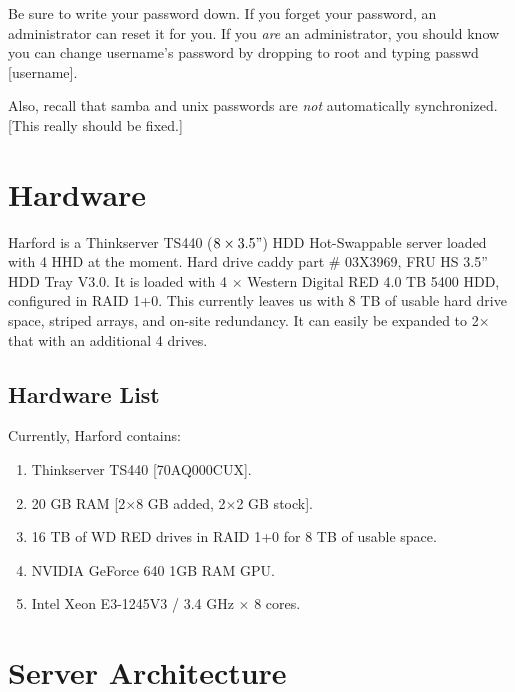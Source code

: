 \documentclass[final,titlepage,letterpaper,oneside,12pt]{article}
\renewcommand{\texttt}[2][BrickRed]{\textcolor{#1}{\ttfamily #2}}%
\begin{document}
Be sure to write your password down. If you forget your password, an administrator can reset it for you. If you \textit{are} an administrator, you should know you can change \texttt{username}'s password by dropping to \texttt{root} and typing \texttt{passwd [username]}.

Also, recall that samba and unix passwords are \textit{not} automatically synchronized. [This really should be fixed.]

\section{Hardware}

Harford is a \texttt{Thinkserver TS440 ($8 \times 3.5"$) HDD Hot-Swappable} server loaded with 4 HHD at the moment. Hard drive caddy part \texttt{\# 03X3969, FRU HS 3.5” HDD Tray V3.0}. It is loaded with 4 $\times$ Western Digital RED 4.0 TB 5400 HDD, configured in RAID 1+0. This currently leaves us with 8 TB of usable hard drive space, striped arrays, and on-site redundancy. It can easily be expanded to 2$\times$ that with an additional 4 drives.

\subsection{Hardware List}

Currently, Harford contains:

\begin{enumerate} \itemsep-2pt
    \item{Thinkserver TS440 [70AQ000CUX].}
    \item{20 GB RAM [2$\times$8 GB added, 2$\times$2 GB stock].}
    \item{16 TB of WD RED drives in RAID 1+0 for 8 TB of usable space.}
    \item{NVIDIA GeForce 640 1GB RAM GPU.}
    \item{Intel Xeon E3-1245V3 / 3.4 GHz $\times$ 8 cores.}
\end{enumerate}

\section{Server Architecture}
\end{document}
